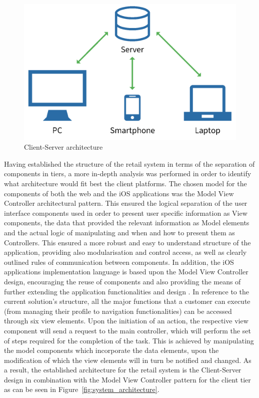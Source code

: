 \begin{figure}[!ht]
\centering
\includegraphics[scale=0.1]{img/Client_Server.png}
\caption{Client-Server architecture\cite{terms_2017}}
\label{fig:client_server_model}
\end{figure}

Having established the structure of the retail system in terms of the separation of components in tiers, a more in-depth analysis was performed in order to identify what architecture would fit best the client platforms. The chosen model for the components of both the web and the iOS applications was the Model View Controller architectural pattern. This ensured the logical separation of the user interface components used in order to present user specific information as View components, the data that provided the relevant information as Model elements and the actual logic of manipulating and when and how to present them as Controllers. This ensured a more robust and easy to understand structure of the application, providing also modularisation and control access, as well as clearly outlined rules of communication between components. In addition, the iOS applications implementation language is based upon the Model View Controller design, encouraging the reuse of components and also providing the means of further extending the application functionalities and design \cite{client-server_model_2017}. In reference to the current solution's structure, all the major functions that a customer can execute (from  managing their profile to navigation functionalities) can be accessed through six view elements. Upon the initiation of an action, the respective view component will send a request to the main controller, which will perform the set of steps required for the completion of the task. This is achieved by manipulating the model components which incorporate the data elements, upon the modification of which the view elements will in turn be notified and changed. As a result, the established architecture for the retail system is the Client-Server design in combination with the Model View Controller pattern for the client tier as can be seen in Figure~\ref{fig:system_architecture}.\\


